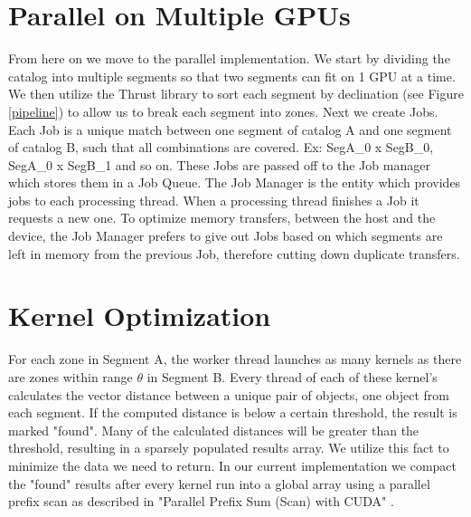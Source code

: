 \section{Parallel on Multiple GPUs}
From here on we move to the parallel implementation. We start by dividing the catalog into multiple segments so that two segments can fit on 1 GPU at a time. We then utilize the Thrust library to sort each segment by declination (see Figure \ref{pipeline}) to allow us to break each segment into zones. Next we create Jobs. Each Job is a unique match between one segment of catalog A and one segment of catalog B, such that all combinations are covered. Ex: SegA\_0 x SegB\_0, SegA\_0 x SegB\_1 and so on. These Jobs are passed off to the Job manager which stores them in a Job Queue. The Job Manager is the entity which provides jobs to each processing thread. When a processing thread finishes a Job it requests a new one. To optimize memory transfers, between the host and the device, the Job Manager prefers to give out Jobs based on which segments are left in memory from the previous Job, therefore cutting down duplicate transfers.

\section{Kernel Optimization}
For each zone in Segment A, the worker thread launches as many kernels as there are zones within range $\theta$ in Segment B. Every thread of each of these kernel's calculates the vector distance between a unique pair of objects, one object from each segment. If the computed distance is below a certain threshold, the result is marked "found". Many of the calculated distances will be greater than the threshold, resulting in a sparsely populated results array. We utilize this fact to minimize the data we need to return. In our current implementation we compact the "found" results after every kernel run into a global array using a parallel prefix scan as described in "Parallel Prefix Sum (Scan) with CUDA" \citet{harris2007parallel}.

